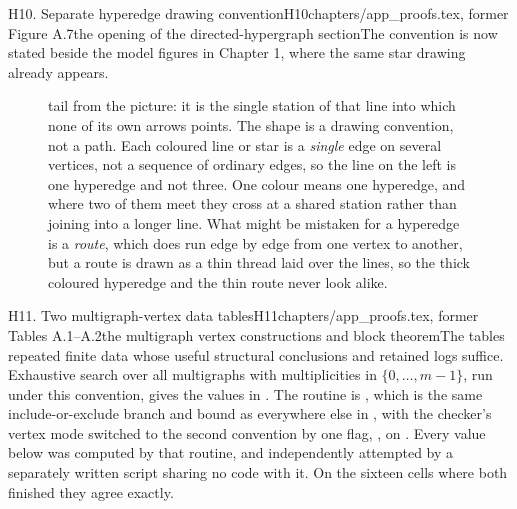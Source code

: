 \begin{offcut}{H10. Separate hyperedge drawing convention}{H10}{chapters/app\_proofs.tex, former Figure A.7}{the opening of the directed-hypergraph section}{The convention is now stated beside the model figures in Chapter 1, where the same star drawing already appears.}
\begin{figure}[htbp]
{tail from the picture: it is the single station of that line into which none of its
own arrows points. The shape is a drawing convention, not a path. Each coloured line
or star is a \emph{single} edge on several vertices, not a sequence of ordinary
edges, so the line on the left is one hyperedge and not three. One colour means
one hyperedge, and where two of them meet they cross at a shared station rather
than joining into a longer line. What might be mistaken for a hyperedge is a
\emph{route}, which does run edge by edge from one vertex to another, but a route
is drawn as a thin thread laid over the lines, so the thick coloured hyperedge
and the thin route never look alike.}
\label{fig:dir-hyper-convention}
\end{figure}
\end{offcut}

\begin{offcut}{H11. Two multigraph-vertex data tables}{H11}{chapters/app\_proofs.tex, former Tables A.1--A.2}{the multigraph vertex constructions and block theorem}{The tables repeated finite data whose useful structural conclusions and retained logs suffice.}
Exhaustive search over all multigraphs with multiplicities in $\{0, \dots, m-1\}$, run under this convention, gives the values in . The routine is , which is the same include-or-exclude branch and bound as everywhere else in , with the checker's vertex mode switched to the second convention by one flag, , on . Every value below was computed by that routine, and independently attempted by a separately written script sharing no code with it. On the sixteen cells where both finished they agree exactly.


\end{offcut}
